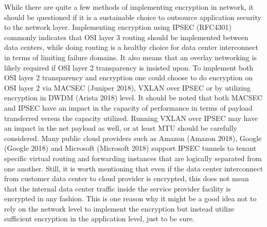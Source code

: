 \documentclass{article}
\begin{document}
While there are quite a few methods of implementing encryption in network, it should be questioned if it is a sustainable choice to outsource application security to the network layer. Implementing encryption using IPSEC (RFC4301) commonly indicates that OSI layer 3 routing should be implemented between data centers, while doing routing is a healthy choice for data center interconnect in terms of limiting failure domains. It also means that an overlay networking is likely required if OSI layer 2 transparency is insisted upon. To implement both OSI layer 2 transparency and encryption one could choose to do encryption on OSI layer 2 via MACSEC (Juniper 2018), VXLAN over IPSEC or by utilizing encryption in DWDM (Arista 2018) level. It should be noted that both MACSEC and IPSEC have an impact in the capacity of performance in terms of payload transferred versus the capacity utilized. Running VXLAN over IPSEC may have an impact in the net payload as well, or at least MTU should be carefully considered. Many public cloud providers such as Amazon (Amazon 2018), Google (Google 2018) and Microsoft (Microsoft 2018) support IPSEC tunnels to tenant specific virtual routing and forwarding instances that are logically separated from one another. Still, it is worth mentioning that even if the data center interconnect from customer data center to cloud provider is encrypted, this does not mean that the internal data center traffic inside the service provider facility is encrypted in any fashion. This is one reason why it might be a good idea not to rely on the network level to implement the encryption but instead utilize sufficient encryption in the application level, just to be sure.
\end{document}
